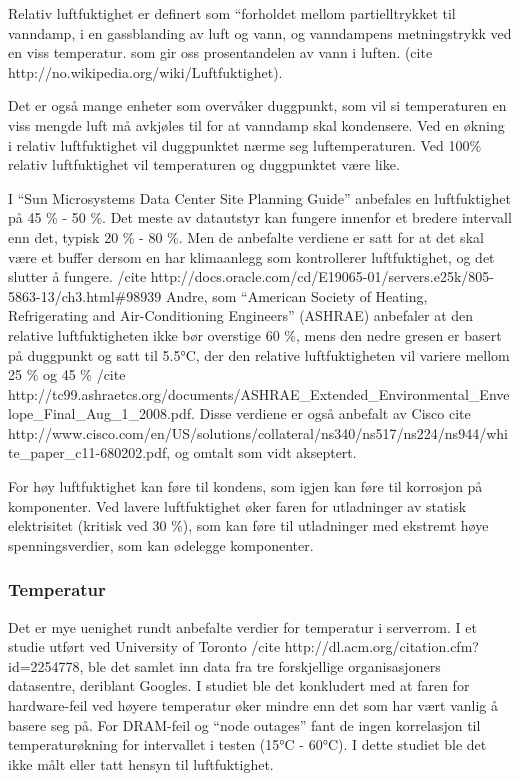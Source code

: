 Relativ luftfuktighet er definert som “forholdet mellom partielltrykket til vanndamp, i en gassblanding av luft og vann, og vanndampens metningstrykk ved en viss temperatur. som gir oss prosentandelen av vann i luften. (cite http://no.wikipedia.org/wiki/Luftfuktighet). 

Det er også mange enheter som overvåker duggpunkt, som vil si temperaturen en viss mengde luft må avkjøles til for at vanndamp skal kondensere. Ved en økning i relativ luftfuktighet vil duggpunktet nærme seg luftemperaturen. Ved 100\% relativ luftfuktighet vil temperaturen og duggpunktet være like. 

I “Sun Microsystems Data Center Site Planning Guide” anbefales en luftfuktighet på 45 \% - 50 \%. Det meste av datautstyr kan fungere innenfor et bredere intervall enn det, typisk 20 \% - 80 \%. Men de anbefalte verdiene er satt for at det skal være et buffer dersom en har klimaanlegg som kontrollerer luftfuktighet, og det slutter å fungere. /cite http://docs.oracle.com/cd/E19065-01/servers.e25k/805-5863-13/ch3.html\#98939 Andre, som “American Society of Heating, Refrigerating and Air-Conditioning Engineers” (ASHRAE) anbefaler at den relative luftfuktigheten ikke bør overstige 60 \%, mens den nedre gresen er basert på duggpunkt og satt til 5.5°C, der den relative luftfuktigheten vil variere mellom 25 \% og 45 \% /cite http://tc99.ashraetcs.org/documents/ASHRAE\_Extended\_Environmental\_Envelope\_Final\_Aug\_1\_2008.pdf. Disse verdiene er også anbefalt av Cisco cite http://www.cisco.com/en/US/solutions/collateral/ns340/ns517/ns224/ns944/white\_paper\_c11-680202.pdf, og omtalt som vidt akseptert. 

For høy luftfuktighet kan føre til kondens, som igjen kan føre til korrosjon på komponenter. Ved lavere luftfuktighet øker faren for utladninger av statisk elektrisitet (kritisk ved 30 \%), som kan føre til utladninger med ekstremt høye spenningsverdier, som kan ødelegge komponenter.

\subsubsection{Temperatur}

Det er mye uenighet rundt anbefalte verdier for temperatur i serverrom. I et studie utført ved University of Toronto /cite http://dl.acm.org/citation.cfm?id=2254778, ble det samlet inn data fra tre forskjellige organisasjoners datasentre, deriblant Googles. I studiet ble det konkludert med at faren for hardware-feil ved høyere temperatur øker mindre enn det som har vært vanlig å basere seg på. For DRAM-feil og ``node outages'' fant de ingen korrelasjon til temperaturøkning for intervallet i testen (15°C - 60°C). I dette studiet ble det ikke målt eller tatt hensyn til luftfuktighet. 

